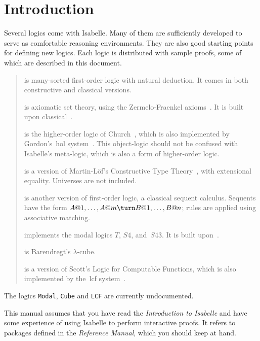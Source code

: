 \chapter{Introduction}
Several logics come with Isabelle.  Many of them are sufficiently developed
to serve as comfortable reasoning environments.  They are also good
starting points for defining new logics.  Each logic is distributed with
sample proofs, some of which are described in this document.

\begin{quote}
{} is many-sorted first-order logic with natural
deduction.  It comes in both constructive and classical versions.

{} is axiomatic set theory, using the Zermelo-Fraenkel
axioms~\cite{suppes72}.  It is built upon classical~\FOL{}.
 
{} is the higher-order logic of Church~\cite{church40},
which is also implemented by Gordon's~{\sc hol} system~\cite{gordon88a}.  This
object-logic should not be confused with Isabelle's meta-logic, which is
also a form of higher-order logic.
 
{} is a version of Martin-L\"of's Constructive Type
Theory~\cite{nordstrom90}, with extensional equality.  Universes are not
included.
 
{} is another version of first-order logic, a classical
sequent calculus.  Sequents have the form $A@1,\ldots,A@m\turn
B@1,\ldots,B@n$; rules are applied using associative matching.

{} implements the modal logics $T$, $S4$, and~$S43$.  It
is built upon~\LK{}.

{} is Barendregt's $\lambda$-cube.

{} is a version of Scott's Logic for Computable Functions,
which is also implemented by the~{\sc lcf} system~\cite{paulson87}.
\end{quote}
The logics {\tt Modal}, {\tt Cube} and {\tt LCF} are currently undocumented.

This manual assumes that you have read the {\em Introduction to Isabelle\/}
and have some experience of using Isabelle to perform interactive proofs.
It refers to packages defined in the {\em Reference Manual}, which you
should keep at hand.


